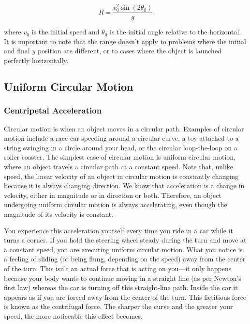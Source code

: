 \documentclass[main-physics.tex]{subfiles}
\begin{document}
\begin{equation} \label{GqvaN1}
    R = \frac{v_0^2 \sin{(2\theta_0)}}{g}
\end{equation}

where $v_0$ is the initial speed and $\theta_0$ is the initial angle relative to the horizontal. It is important to note that the range doesn't apply to problems where the initial and final $y$ position are different, or to cases where the object is launched perfectly horizontally.

\subsection{Uniform Circular Motion} \label{uPOucv}
\subsubsection*{Centripetal Acceleration}

Circular motion is when an object moves in a circular path. Examples of circular motion include a race car speeding around a circular curve, a toy attached to a string swinging in a circle around your head, or the circular loop-the-loop on a roller coaster. The simplest case of circular motion is \gls{uniform circular motion}, where an object travels a circular path at a constant speed. Note that, unlike speed, the linear velocity of an object in circular motion is constantly changing because it is always changing direction. We know that acceleration is a change in velocity, either in magnitude or in direction or both. Therefore, an object undergoing uniform circular motion is always accelerating, even though the magnitude of its velocity is constant.

\vspace{1em}

You experience this acceleration yourself every time you ride in a car while it turns a corner. If you hold the steering wheel steady during the turn and move at a constant speed, you are executing uniform circular motion. What you notice is a feeling of sliding (or being flung, depending on the speed) away from the center of the turn. This isn't an actual force that is acting on you---it only happens because your body wants to continue moving in a straight line (as per Newton's first law) whereas the car is turning off this straight-line path. Inside the car it appears as if you are forced away from the center of the turn. This fictitious force is known as the \gls{centrifugal force}. The sharper the curve and the greater your speed, the more noticeable this effect becomes.
\end{document}
